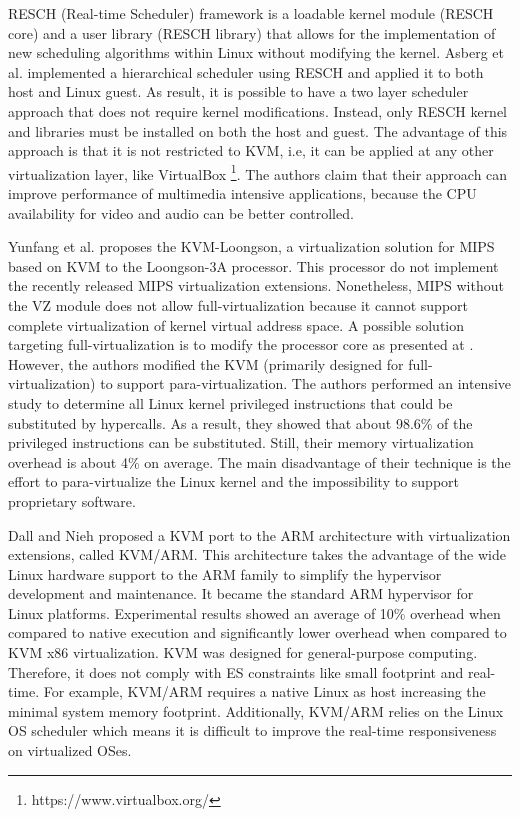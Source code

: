 RESCH (Real-time Scheduler) framework \cite{kato2010} is a loadable kernel module (RESCH core) and a user library (RESCH library) that allows for the  implementation of new scheduling algorithms within Linux without modifying the kernel. Asberg et al. \cite{asberg2011} implemented a hierarchical scheduler using RESCH and applied it to both host and Linux guest. As result, it is possible to have a two layer scheduler approach that does not require kernel modifications. Instead, only RESCH kernel and libraries must be installed on both the host and guest. The advantage of this approach is that it is not restricted to KVM, i.e, it can be applied at any other virtualization layer, like VirtualBox \footnote{https://www.virtualbox.org/}. The authors claim that their approach can improve performance of multimedia intensive applications, because the CPU availability for video and audio can be better controlled. 

Yunfang et al. \cite{Yunfang2013} proposes the KVM-Loongson, a virtualization solution for MIPS based on KVM to the Loongson-3A \cite{loogson3a} processor. This processor do not implement the recently released MIPS virtualization extensions. Nonetheless, MIPS without the VZ module does not allow full-virtualization because it cannot support complete virtualization of kernel virtual address space. A possible solution targeting full-virtualization is to modify the processor core as presented at \cite{VHH_MIPS4Kc}. However, the authors modified the KVM (primarily designed for full-virtualization) to support para-virtualization. The authors performed an intensive study to determine all Linux kernel privileged instructions that could be substituted by hypercalls. As a result, they showed that about 98.6\% of the privileged instructions can be substituted. Still, their memory virtualization overhead is about 4\% on average. The main disadvantage of their technique is the effort to para-virtualize the Linux kernel and the impossibility to support proprietary software. 

Dall and Nieh \cite{Dall2014} proposed a KVM port to the ARM architecture with virtualization extensions, called KVM/ARM. This architecture takes the advantage of the wide Linux hardware support to the ARM family to simplify the hypervisor development and maintenance. It became the standard ARM hypervisor for Linux platforms. Experimental results showed an average of 10\% overhead when compared to native execution and significantly lower overhead when compared to KVM x86 virtualization. KVM was designed for general-purpose computing. Therefore, it does not comply with ES constraints like small footprint and real-time. For example, KVM/ARM requires a native Linux as host increasing the minimal system memory footprint. Additionally, KVM/ARM relies on the Linux OS scheduler which means it is difficult to improve the real-time responsiveness on virtualized OSes. 

